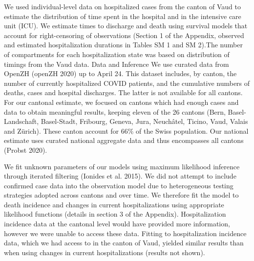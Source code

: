 We used individual-level data on hospitalized cases from the canton of Vaud to estimate the distribution of time spent in the hospital and in the intensive care unit (ICU). We estimate times to discharge and death using survival models that account for right-censoring of observations (Section 1 of the Appendix, observed and estimated hospitalization durations in Tables SM 1 and SM 2).The number of compartments for each hospitalization state was based on distribution of timings from the Vaud data.
Data and Inference
We use curated data from OpenZH (openZH 2020) up to April 24. This dataset includes, by canton, the number of currently hospitalized COVID patients, and the cumulative numbers of deaths, cases and hospital discharges. The latter is not available for all cantons. For our cantonal estimate, we focused on cantons which had enough cases and data to obtain meaningful results, keeping eleven of the 26 cantons (Bern, Basel-Landschaft, Basel-Stadt, Fribourg, Geneva, Jura, Neuchâtel, Ticino, Vaud, Valais and Zürich). These canton account for 66\% of the Swiss population. Our national estimate uses curated national aggregate data and thus encompasses all cantons (Probst 2020).

We fit unknown parameters of our models using maximum likelihood inference through iterated filtering (Ionides et al. 2015). We did not attempt to include confirmed case data into the observation model due to heterogeneous testing strategies adopted across cantons and over time. We therefore fit the model to death incidence and changes in current hospitalizations using appropriate likelihood functions (details in section 3 of the Appendix). Hospitalization incidence data at the cantonal level would have provided more information, however we were unable to access these data. Fitting to hospitalization incidence data, which we had access to in the canton of Vaud, yielded similar results than when using changes in current hospitalizations (results not shown). 

